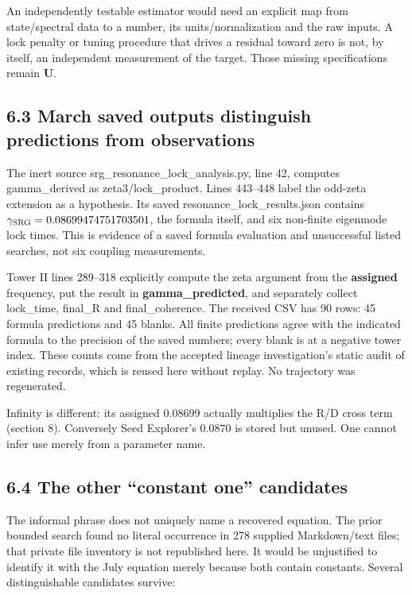 \documentclass[11pt,a4paper]{article}
\begin{document}
An independently testable estimator would need an explicit map from state/spectral data to a number, its units/normalization and the raw inputs. A lock penalty or tuning procedure that drives a residual toward zero is not, by itself, an independent measurement of the target. Those missing specifications remain \textbf{U}.


\subsection*{6.3 March saved outputs distinguish predictions from observations}

The inert source srg\_\allowbreak{}resonance\_\allowbreak{}lock\_\allowbreak{}analysis.py, line 42, computes gamma\_\allowbreak{}derived as zeta3/lock\_\allowbreak{}product. Lines 443--448 label the odd-zeta extension as a hypothesis. Its saved resonance\_\allowbreak{}lock\_\allowbreak{}results.json contains $\gamma_{\rm SRG}=0.08699474751703501$, the formula itself, and six non-finite eigenmode lock times. This is evidence of a saved formula evaluation and unsuccessful listed searches, not six coupling measurements.


Tower II lines 289--318 explicitly compute the zeta argument from the \textbf{assigned} frequency, put the result in \textbf{gamma\_\allowbreak{}predicted}, and separately collect lock\_\allowbreak{}time, final\_\allowbreak{}R and final\_\allowbreak{}coherence. The received CSV has 90 rows: 45 formula predictions and 45 blanks. All finite predictions agree with the indicated formula to the precision of the saved numbers; every blank is at a negative tower index. These counts come from the accepted lineage investigation's static audit of existing records, which is reused here without replay. No trajectory was regenerated.


Infinity is different: its assigned $0.08699$ actually multiplies the R/D cross term (section 8). Conversely Seed Explorer's $0.0870$ is stored but unused. One cannot infer use merely from a parameter name.


\subsection*{6.4 The other ``constant one'' candidates}

The informal phrase does not uniquely name a recovered equation. The prior bounded search found no literal occurrence in 278 supplied Markdown/text files; that private file inventory is not republished here. It would be unjustified to identify it with the July equation merely because both contain constants. Several distinguishable candidates survive:
\end{document}
